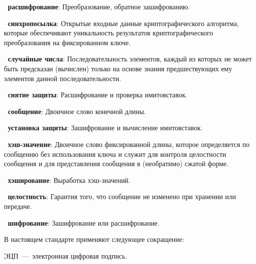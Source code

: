 {\bf \thedefctr~расшифрование}:
Преобразование, обратное зашифрованию.

{\bf \thedefctr~синхропосылка}:
Открытые входные данные криптографического алгоритма,
которые обеспечивают уникальность результатов 
криптографического преобразования на фиксированном ключе.

{\bf \thedefctr~случайные числа}: 
Последовательность элементов, каждый из которых не может быть предсказан
(вычислен) только на основе знания предшествующих ему элементов данной
последовательности.

{\bf \thedefctr~снятие защиты}:
Расшифрование и проверка имитовставок.

{\bf \thedefctr~сообщение}:
Двоичное слово конечной длины.

{\bf \thedefctr~установка защиты}:
Зашифрование и вычисление имитовставок.

{\bf \thedefctr~хэш-значение}:
Двоичное слово фиксированной длины, 
которое определяется по сообщению без использования ключа и 
служит для контроля целостности сообщения и для представления 
сообщения в (необратимо) сжатой форме.

{\bf \thedefctr~хэширование}:
Выработка хэш-значений.

{\bf \thedefctr~целостность}:
Гарантия того, что сообщение не изменено 
при хранении или передаче.

{\bf \thedefctr~шифрование}:
Зашифрование или расшифрование.

В настоящем стандарте применяют следующее сокращение:

ЭЦП~---~электронная цифровая подпись.



